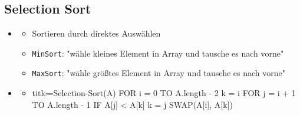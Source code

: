 \documentclass[
    ngerman,
    color=3b,
    load_common, %
    summary,
    boxarc,
]{tuda_summary}
\begin{document}
\subsection{Selection Sort}\label{Selection sort}
\begin{itemize}
    \item {}
          \begin{itemize}
              \item Sortieren durch direktes Auswählen
              \item \texttt{MinSort}: "wähle kleines Element in Array und tausche es nach vorne"
              \item \texttt{MaxSort}: "wähle größtes Element in Array und tausche es nach vorne"
          \end{itemize}

    \item {}
          \begin{itemize}
              \item[]
                    \begin{codeBlock}[autogobble]{title=Selection-Sort(A)}
                        FOR i = 0 TO A.length - 2
                            k = i
                            FOR j = i + 1 TO A.length - 1
                                IF A[j] < A[k]
                                    k = j
                            SWAP(A[i], A[k])
                    \end{codeBlock}
          \end{itemize}
\end{itemize}

\end{document}
